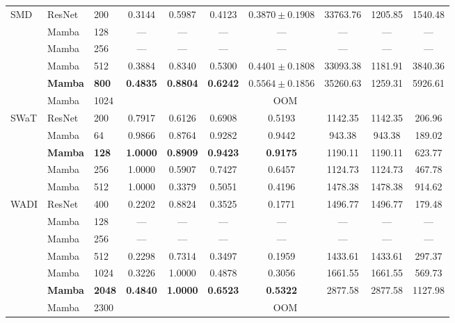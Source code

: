 \documentclass[runningheads]{llncs}
\begin{document}
\begin{table}[H]
{\begin{tabular}{lllccccccc}
\multirow{6}{*}{SMD}
 & ResNet & 200   & 0.3144 & 0.5987 & 0.4123 & $0.3870\pm0.1908$ & 33763.76 & 1205.85 & 1540.48 \\
 & Mamba  & 128   & \textsf{---} & \textsf{---} & \textsf{---} & \textsf{---} & \textsf{---} & \textsf{---} & \textsf{---} \\
 & Mamba  & 256   & \textsf{---} & \textsf{---} & \textsf{---} & \textsf{---} & \textsf{---} & \textsf{---} & \textsf{---} \\
 & Mamba  & 512   & 0.3884 & 0.8340 & 0.5300 & $0.4401\pm0.1808$ & 33093.38 & 1181.91 & 3840.36 \\
 & \textbf{Mamba}  & \textbf{800}   & \textbf{0.4835} & \textbf{0.8804} & \textbf{0.6242} & $\mathbf{0.5564\pm0.1856}$ & 35260.63 & 1259.31 & 5926.61 \\
 & Mamba  & 1024  & \multicolumn{7}{c}{\textsf{OOM}} \\
\midrule

\multirow{5}{*}{SWaT}
 & ResNet & 200   & 0.7917 & 0.6126 & 0.6908 & 0.5193 & 1142.35 & 1142.35 & 206.96 \\
 & Mamba  & 64    & 0.9866 & 0.8764 & 0.9282 & 0.9442 &  943.38 &  943.38 & 189.02 \\
 & \textbf{Mamba}  & \textbf{128}   & \textbf{1.0000} & \textbf{0.8909} & \textbf{0.9423} & \textbf{0.9175} & 1190.11 & 1190.11 & 623.77 \\
 & Mamba  & 256   & 1.0000 & 0.5907 & 0.7427 & 0.6457 & 1124.73 & 1124.73 & 467.78 \\
 & Mamba  & 512   & 1.0000 & 0.3379 & 0.5051 & 0.4196 & 1478.38 & 1478.38 & 914.62 \\
\midrule

\multirow{7}{*}{WADI}
 & ResNet & 400   & 0.2202 & 0.8824 & 0.3525 & 0.1771 & 1496.77 & 1496.77 & 179.48 \\
 & Mamba  & 128   & \textsf{---} & \textsf{---} & \textsf{---} & \textsf{---} & \textsf{---} & \textsf{---} & \textsf{---} \\
 & Mamba  & 256   & \textsf{---} & \textsf{---} & \textsf{---} & \textsf{---} & \textsf{---} & \textsf{---} & \textsf{---} \\
 & Mamba  & 512   & 0.2298 & 0.7314 & 0.3497 & 0.1959 & 1433.61 & 1433.61 & 297.37 \\
 & Mamba  & 1024  & 0.3226 & 1.0000 & 0.4878 & 0.3056 & 1661.55 & 1661.55 & 569.73 \\
 & \textbf{Mamba}  & \textbf{2048}  & \textbf{0.4840} & \textbf{1.0000} & \textbf{0.6523} & \textbf{0.5322} & 2877.58 & 2877.58 & 1127.98 \\
 & Mamba  & 2300  & \multicolumn{7}{c}{\textsf{OOM}} \\
\midrule


\end{tabular}}
\end{table}
\end{document}

